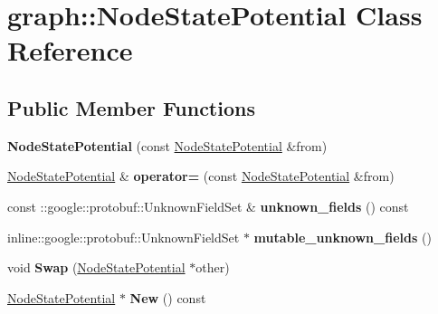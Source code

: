 \hypertarget{classgraph_1_1NodeStatePotential}{
\section{graph::NodeStatePotential Class Reference}
\label{classgraph_1_1NodeStatePotential}
}
\subsection*{Public Member Functions}
\begin{DoxyCompactItemize}
\item 
\hypertarget{classgraph_1_1NodeStatePotential_abe93f0f8c63b6b1861903c72d29bf718}{
{\bfseries NodeStatePotential} (const \hyperlink{classgraph_1_1NodeStatePotential}{NodeStatePotential} \&from)}
\label{classgraph_1_1NodeStatePotential_abe93f0f8c63b6b1861903c72d29bf718}

\item 
\hypertarget{classgraph_1_1NodeStatePotential_a004077f286e88ffafc8b40300d44e201}{
\hyperlink{classgraph_1_1NodeStatePotential}{NodeStatePotential} \& {\bfseries operator=} (const \hyperlink{classgraph_1_1NodeStatePotential}{NodeStatePotential} \&from)}
\label{classgraph_1_1NodeStatePotential_a004077f286e88ffafc8b40300d44e201}

\item 
\hypertarget{classgraph_1_1NodeStatePotential_add63ea9eec1f3caff6ee19c4525e5972}{
const ::google::protobuf::UnknownFieldSet \& {\bfseries unknown\_\-fields} () const }
\label{classgraph_1_1NodeStatePotential_add63ea9eec1f3caff6ee19c4525e5972}

\item 
\hypertarget{classgraph_1_1NodeStatePotential_abb591e0b424e774040f8109c92413f0d}{
inline::google::protobuf::UnknownFieldSet $\ast$ {\bfseries mutable\_\-unknown\_\-fields} ()}
\label{classgraph_1_1NodeStatePotential_abb591e0b424e774040f8109c92413f0d}

\item 
\hypertarget{classgraph_1_1NodeStatePotential_a13b774b1f32294830d162db5e80eb3b7}{
void {\bfseries Swap} (\hyperlink{classgraph_1_1NodeStatePotential}{NodeStatePotential} $\ast$other)}
\label{classgraph_1_1NodeStatePotential_a13b774b1f32294830d162db5e80eb3b7}

\item 
\hypertarget{classgraph_1_1NodeStatePotential_a6f819e5355771389d1e278e8919d25cf}{
\hyperlink{classgraph_1_1NodeStatePotential}{NodeStatePotential} $\ast$ {\bfseries New} () const }
\label{classgraph_1_1NodeStatePotential_a6f819e5355771389d1e278e8919d25cf}


\end{DoxyCompactItemize}
